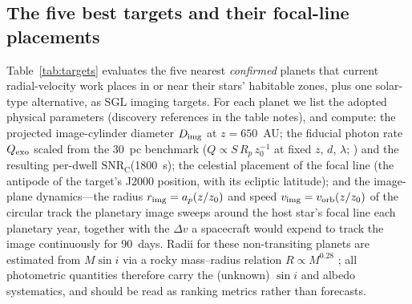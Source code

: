 ﻿\documentclass[twocolumn]{emulateapj}
\begin{document}
\subsection{The five best targets and their focal-line placements}
\label{sec:targets}

Table~\ref{tab:targets} evaluates the five nearest {\it confirmed}
planets that current radial-velocity work places in or near their
stars' habitable zones, plus one solar-type alternative, as SGL imaging
targets. For each planet we list the adopted physical parameters
(discovery references in the table notes), and compute: the projected
image-cylinder diameter $D_{\rm img}$ at $z=650$~AU; the fiducial
photon rate $Q_{\rm exo}$ scaled from the 30~pc benchmark
($Q\propto S\,R_p\,z_0^{-1}$ at fixed $z$, $d$, $\lambda$;
\citealt{tt22mnras}) and the resulting per-dwell
$\mathrm{SNR_C}$(1800~s); the celestial placement of the focal line
(the antipode of the target's J2000 position, with its ecliptic
latitude); and the image-plane dynamics---the radius
$r_{\rm img}=a_p(z/z_0)$ and speed
$v_{\rm img}=v_{\rm orb}(z/z_0)$ of the circular track the planetary
image sweeps around the host star's focal line each planetary year,
together with the $\Delta v$ a spacecraft would expend to track the
image continuously for 90~days. Radii for these non-transiting planets
are estimated from $M\sin i$ via a rocky mass--radius relation
$R\propto M^{0.28}$ \citep{chenkipping17}; all photometric quantities
therefore carry the (unknown) $\sin i$ and albedo systematics, and
should be read as ranking metrics rather than forecasts.
\end{document}
